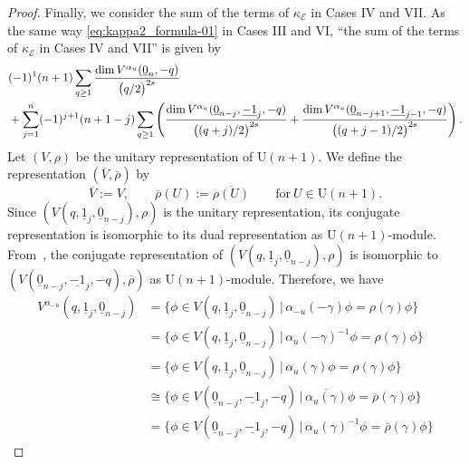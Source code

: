 \documentclass[10pt,a4paper]{amsart}
\numberwithin{equation}{section}
\newcommand{\cE}{\mathcal{E}}
\begin{document}
\begin{proof}
 Finally, we consider the sum of the terms of $\kappa_{\cE}$ in Cases IV and VII.
 As the same way \eqref{eq:kappa2_formula-01} in Cases III and VI,
 ``the sum of the terms of $\kappa_{\cE}$ in Cases IV and VII''
 is given by
 \begin{align}
 &
 (-1 )^{1} (n+1)
 \sum_{q \geq 1 }
 \frac{
 \dim V^{\alpha_u} ( \underline{0}_{n}, -q )
 }{
 \bigl( q /2 \bigr)^{2s}
 }
 \label{eq:kappa3_formula-01}
 \\
 &{}+
 \sum_{j=1}^{n}
 (-1 )^{j+1} (n+1-j)
 \sum_{q \geq 1 }
 \left(
 \frac{
 \dim V^{\alpha_u} ( \underline{0}_{n-j}, \underline{-1}_{j} , -q )
 }{
 \bigl( ( q+j)/2 \bigr)^{2s}
 }
 +
 \frac{
 \dim V^{\alpha_u} ( \underline{0}_{n-j+1}, \underline{-1}_{j-1} , -q )
 }{
 \bigl( (q+j-1)/2 \bigr)^{2s}
 }
 \right). \notag
 \end{align}
 Let $(V , \rho)$ be the unitary representation of $\mathrm{U}(n+1)$.
 We define the representation $(\overline{V}, \overline{\rho})$ by
 \[
 \overline{V} := V,
 \qquad
 \overline{\rho} (U)
 :=
 \overline{\rho (U)}
 \qquad \text{for} \ U \in \mathrm{U} (n+1)
 .
 \]
 Since $(V ( q, \underline{1}_{j} ,\underline{0}_{n-j} ) ,\rho )$ is the unitary representation,
 its conjugate representation is isomorphic to its dual representation as $\mathrm{U}(n+1)$-module.
 From~\cite[Theorem 3.2.13]{Goodman-Wallach-09},
 the conjugate representation of $( V ( q, \underline{1}_{j} ,\underline{0}_{n-j} ) , \rho )$ is isomorphic to
 $(V ( \underline{0}_{n-j} , \underline{-1}_{j} , -q ) , \overline{\rho} )$ as $\mathrm{U}(n+1)$-module.
 Therefore, we have
 \begin{align*}
 V^{\alpha_{-u}} ( q, \underline{1}_{j} ,\underline{0}_{n-j} )
 & =
 \big\{ \phi \in V ( q, \underline{1}_{j} ,\underline{0}_{n-j}) \, \big| \, \alpha_{-u} (- \gamma ) \phi = \rho ( \gamma ) \phi \big\}
 \\
 & =
 \big\{ \phi \in V ( q, \underline{1}_{j} ,\underline{0}_{n-j}) \, \big| \, \alpha_u (- \gamma )^{-1} \phi = \rho ( \gamma ) \phi \big\}
 \\
 & =
 \big\{ \phi \in V ( q, \underline{1}_{j} ,\underline{0}_{n-j}) \, \big| \, \alpha_u ( \gamma ) \phi = \rho ( \gamma ) \phi \big\}
 \\
 & \cong
 \big\{ \phi \in V ( \underline{0}_{n-j}, \underline{-1}_{j} , -q ) \, \big| \, \overline{\alpha_u ( \gamma )} \phi = \overline{\rho} ( \gamma ) \phi \big\}
 \\
 & =
 \big\{ \phi \in V ( \underline{0}_{n-j}, \underline{-1}_{j} ,-q ) \, \big| \, \alpha_u ( \gamma )^{-1} \phi = \overline{\rho} ( \gamma ) \phi \big\}

\end{align*}
\end{proof}
\end{document}
